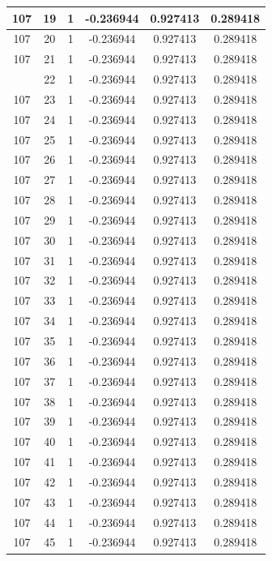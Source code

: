 \documentclass[12pt,a4paper]{article}
\numberwithin{equation}{section}
\numberwithin{figure}{section}
\numberwithin{table}{section}
\begin{document}
\begin{longtable}{|c|c|c|c|c|c|}
107 & 19 & 1 & -0.236944 & 0.927413 & 0.289418 \\ \hline
107 & 20 & 1 & -0.236944 & 0.927413 & 0.289418 \\ \hline
107 & 21 & 1 & -0.236944 & 0.927413 & 0.289418 \\ \hline
\pagebreak
107 & 22 & 1 & -0.236944 & 0.927413 & 0.289418 \\ \hline
107 & 23 & 1 & -0.236944 & 0.927413 & 0.289418 \\ \hline
107 & 24 & 1 & -0.236944 & 0.927413 & 0.289418 \\ \hline
107 & 25 & 1 & -0.236944 & 0.927413 & 0.289418 \\ \hline
107 & 26 & 1 & -0.236944 & 0.927413 & 0.289418 \\ \hline
107 & 27 & 1 & -0.236944 & 0.927413 & 0.289418 \\ \hline
107 & 28 & 1 & -0.236944 & 0.927413 & 0.289418 \\ \hline
107 & 29 & 1 & -0.236944 & 0.927413 & 0.289418 \\ \hline
107 & 30 & 1 & -0.236944 & 0.927413 & 0.289418 \\ \hline
107 & 31 & 1 & -0.236944 & 0.927413 & 0.289418 \\ \hline
107 & 32 & 1 & -0.236944 & 0.927413 & 0.289418 \\ \hline
107 & 33 & 1 & -0.236944 & 0.927413 & 0.289418 \\ \hline
107 & 34 & 1 & -0.236944 & 0.927413 & 0.289418 \\ \hline
107 & 35 & 1 & -0.236944 & 0.927413 & 0.289418 \\ \hline
107 & 36 & 1 & -0.236944 & 0.927413 & 0.289418 \\ \hline
107 & 37 & 1 & -0.236944 & 0.927413 & 0.289418 \\ \hline
107 & 38 & 1 & -0.236944 & 0.927413 & 0.289418 \\ \hline
107 & 39 & 1 & -0.236944 & 0.927413 & 0.289418 \\ \hline
107 & 40 & 1 & -0.236944 & 0.927413 & 0.289418 \\ \hline
107 & 41 & 1 & -0.236944 & 0.927413 & 0.289418 \\ \hline
107 & 42 & 1 & -0.236944 & 0.927413 & 0.289418 \\ \hline
107 & 43 & 1 & -0.236944 & 0.927413 & 0.289418 \\ \hline
107 & 44 & 1 & -0.236944 & 0.927413 & 0.289418 \\ \hline
107 & 45 & 1 & -0.236944 & 0.927413 & 0.289418 \\ \hline

\end{longtable}
\end{document}
